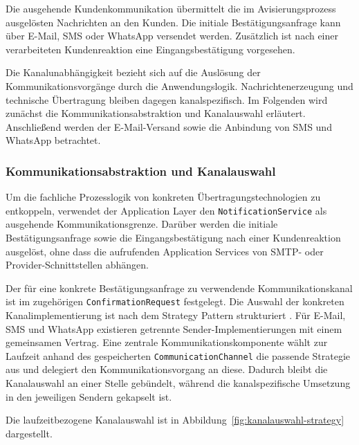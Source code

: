\documentclass[
  12pt,
  a4paper,
  oneside
]{article}
\begin{document}
Die ausgehende Kundenkommunikation übermittelt die im Avisierungsprozess
ausgelösten Nachrichten an den Kunden. Die initiale
Bestätigungsanfrage kann über E-Mail, SMS oder WhatsApp versendet werden.
Zusätzlich ist nach einer verarbeiteten Kundenreaktion eine Eingangsbestätigung
vorgesehen.

Die Kanalunabhängigkeit bezieht sich auf die Auslösung der
Kommunikationsvorgänge durch die Anwendungslogik. Nachrichtenerzeugung und
technische Übertragung bleiben dagegen kanalspezifisch. Im Folgenden wird
zunächst die Kommunikationsabstraktion und Kanalauswahl erläutert. Anschließend
werden der E-Mail-Versand sowie die Anbindung von SMS und WhatsApp betrachtet.

\subsubsection{Kommunikationsabstraktion und Kanalauswahl}
\label{sec:kommunikationsabstraktion}

Um die fachliche Prozesslogik von konkreten Übertragungstechnologien zu
entkoppeln, verwendet der Application Layer den \texttt{NotificationService}
als ausgehende Kommunikationsgrenze. Darüber werden die initiale
Bestätigungsanfrage sowie die Eingangsbestätigung nach einer
Kundenreaktion ausgelöst, ohne dass die aufrufenden Application Services von
SMTP- oder Provider-Schnittstellen abhängen.

Der für eine konkrete Bestätigungsanfrage zu verwendende
Kommunikationskanal ist im zugehörigen \texttt{ConfirmationRequest} festgelegt.
Die Auswahl der konkreten Kanalimplementierung ist nach dem Strategy Pattern
strukturiert \parencite{gamma1994designPatterns}. Für E-Mail, SMS und WhatsApp existieren
getrennte Sender-Implementierungen mit einem gemeinsamen Vertrag. Eine zentrale
Kommunikationskomponente wählt zur Laufzeit anhand des gespeicherten
\texttt{CommunicationChannel} die passende Strategie aus und delegiert den
Kommunikationsvorgang an diese. Dadurch bleibt die Kanalauswahl an einer Stelle
gebündelt, während die kanalspezifische Umsetzung in den jeweiligen Sendern
gekapselt ist.

Die laufzeitbezogene Kanalauswahl ist in
Abbildung~\ref{fig:kanalauswahl-strategy} dargestellt.
\end{document}
